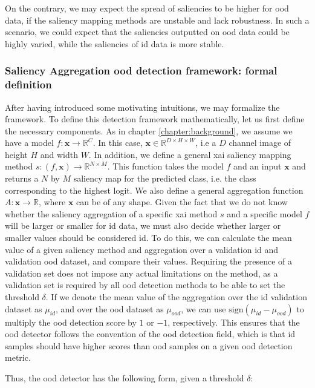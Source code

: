 \documentclass[UKenglish]{uiomasterthesis} %
\newcommand{\R}{\mathbb{R}}
\theoremstyle{definition}
\begin{document}
On the contrary, we may expect the spread of saliencies to be higher for \ac{ood} data, if the saliency mapping methods are unstable and lack robustness. In such a scenario, we could expect that the saliencies outputted on \ac{ood} data could be highly varied, while the saliencies of \ac{id} data is more stable.

\subsubsection{Saliency Aggregation \ac{ood} detection framework: formal definition}

After having introduced some motivating intuitions, we may formalize the framework. To define this detection framework mathematically, let us first define the necessary components. As in chapter \ref{chapter:background}, we assume we have a model $f: \bm{x} \to \R^C$. In this case, $\bm{x} \in \R^{D \times H \times W}$, i.e a $D$ channel image of height $H$ and width $W$. In addition, we define a general \ac{xai} saliency mapping method $s: (f, \bm{x}) \to \R^{N \times M}$. This function takes the model $f$ and an input $\bm{x}$ and returns a $N$ by $M$ saliency map for the predicted class, i.e. the class corresponding to the highest logit. We also define a general aggregation function $A: \bm{x} \rightarrow \R$, where $\bm{x}$ can be of any shape. Given the fact that we do not know whether the saliency aggregation of a specific \ac{xai} method $s$ and a specific model $f$ will be larger or smaller for \ac{id} data, we must also decide whether larger or smaller values should be considered \ac{id}. To do this, we can calculate the mean value of a given saliency method and aggregation over a validation \ac{id} and validation \ac{ood} dataset, and compare their values. Requiring the presence of a validation set does not impose any actual limitations on the method, as a validation set is required by all \ac{ood} detection methods to be able to set the threshold $\delta$. If we denote the mean value of the aggregation over the \ac{id} validation dataset as $\mu_{id}$, and over the \ac{ood} dataset as $\mu_{ood}$, we can use $\text{sign}(\mu_{id} - \mu_{ood})$ to multiply the \ac{ood} detection score by $1$ or $-1$, respectively. This ensures that the \ac{ood} detector follows the convention of the \ac{ood} detection field, which is that \ac{id} samples should have higher scores than \ac{ood} samples on a given \ac{ood} detection metric.

Thus, the \ac{ood} detector has the following form, given a threshold $\delta$:
\end{document}
